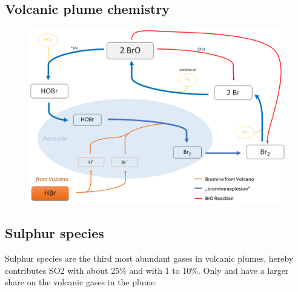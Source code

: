 \documentclass  [
  paper    = a4,
  BCOR     = 10mm,
  twoside,
  fontsize = 12pt,
  fleqn,
  toc      = bibnumbered,
  toc      = listofnumbered,
  numbers  = noendperiod,
  headings = normal,
  listof   = leveldown,
  version  = 3.03
]                                       {scrreprt}
\begin{document}
{	\subsection{Volcanic plume chemistry}
	\begin{figure}
		\centering
		\includegraphics[width=0.7\linewidth]{Bilder/Simon/Bilder_Tung/BrO_Explosion}
		\caption{}
		\label{fig:broexplosion}
	\end{figure}}
	\subsection{Sulphur species}
	Sulphur species are the third most abundant gases in volcanic plumes, hereby contributes SO2 with about 25\% and  with 1 to 10\%. Only  and  have a larger share on the volcanic gases in the plume.
	
	
	
	
	
	
	
	
	
	
	
	
	
	
	
	
	
	
	
	
	
	
	
\end{document}
